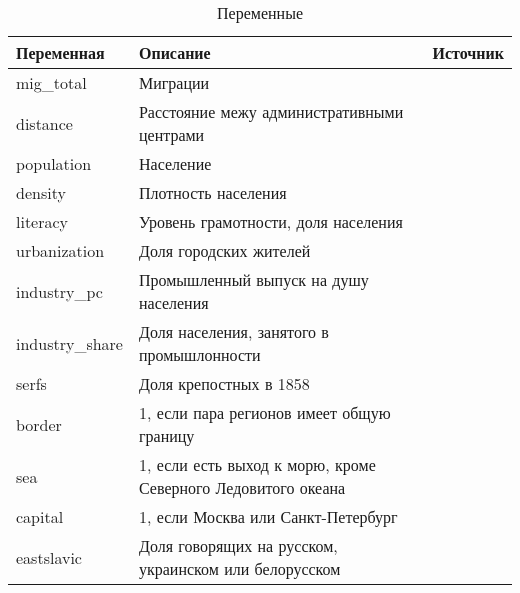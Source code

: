 \begin{longtable}{p{} p{} p{}}
	\caption{Переменные}\\
	\toprule
	Переменная     & Описание                                                     & Источник                         \\* \midrule
	\endfirsthead
	\endhead
	\bottomrule
	\endfoot
	\endlastfoot
	mig\_total      & Миграции                                                     & \cite{census_1897}               \\
	distance       & Расстояние межу административными центрами                   & \cite{geohack}                   \\
	population     & Население                                                    & \cite{ristat_2020}               \\
	density        & Плотность населения                                          &                                  \\
	literacy       & Уровень грамотности, доля населения                          &                                  \\
	urbanization   & Доля городских жителей                                       &                                  \\
	industry\_pc    & Промышленный выпуск на душу населения                        &                                  \\
	industry\_share & Доля населения, занятого в промышлонности                    & \cite{global}                    \\
	serfs          & Доля крепостных в 1858                                       & \cite{markevich_abolition_2018, serfs_1861}  \\
	border         & 1, если пара регионов имеет общую границу                    & \cite{sablin_transcultural_2018} \\
	sea            & 1, если есть выход к морю, кроме Северного Ледовитого океана &                                  \\
	capital        & 1, если Москва или Санкт-Петербург                           &                                  \\
	eastslavic     & Доля говорящих на русском, украинском или белорусском        &                                  \\

\end{longtable}
